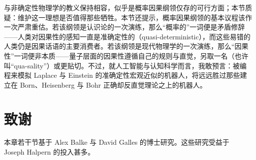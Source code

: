 与非确定性物理学的教义保持相容，似乎是概率因果纲领仅存的可行方面；本节质疑：维护这一理想是否值得那些牺牲。本节还提示，概率因果纲领的基本议程该作一次严肃重估。若该纲领是认识论的一次演练，那么“概率的”一词便是矛盾修辞——人类对因果性的感知一直是准确定性的（quasi-deterministic），而这些易错的人类仍是因果话语的主要消费者。若该纲领是现代物理学的一次演练，那么“因果性”一词便非本质——量子层面的因果性遵循自己的规则与直觉，另取一名（也许叫“qua-sality”）或更贴切。不过，就人工智能与认知科学而言，我敢预言：被编程来模拟 Laplace 与 Einstein 的准确定性宏观近似的机器人，将远远胜过那些建立在 Born、Heisenberg 与 Bohr 正确却反直觉理论之上的机器人。

\section*{致谢}

本章若干节基于 Alex Balke 与 David Galles 的博士研究。这些研究受益于 Joseph Halpern 的投入甚多。
